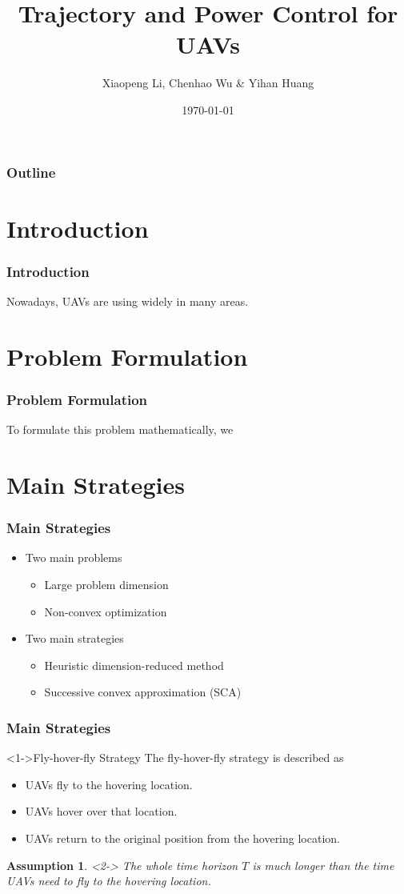 \documentclass[handout,11.5pt]{beamer}
\author[X. Li, C. Wu, \& Y. Huang]{Xiaopeng Li, Chenhao Wu \& Yihan Huang}
\title{Trajectory and Power Control for UAVs}
\institute[CUHK(SZ)]{The Chinese University of Hong Kong, Shenzhen}
\date{\today}
\newtheorem{assumption}{Assumption}
\begin{document}
\frame{\titlepage}

\begin{frame}
	\frametitle{Outline}
	\tableofcontents
\end{frame}

\section{Introduction}
\begin{frame}
	\frametitle{Introduction}
	Nowadays, UAVs are using widely in many areas.
\end{frame}

\section{Problem Formulation}
\begin{frame}
	\frametitle{Problem Formulation}
	To formulate this problem mathematically, we 
\end{frame}

\section{Main Strategies}
\begin{frame}
	\frametitle{Main Strategies}
	\begin{itemize}\itemsep4em
		\item<1-> Two main problems
		\begin{itemize}
			\item Large problem dimension
			\item Non-convex optimization
		\end{itemize}
		\item<2-> Two main strategies
		\begin{itemize}
			\item Heuristic dimension-reduced method
			\item Successive convex approximation (SCA)
		\end{itemize}
	\end{itemize}
\end{frame}


\begin{frame}
\frametitle{Main Strategies}
	\begin{block}<1->{Fly-hover-fly Strategy}
		The fly-hover-fly strategy is described as
		\begin{itemize}
			\item UAVs fly to the hovering location.
			\item UAVs hover over that location.
			\item UAVs return to the original position from the hovering location.
		\end{itemize}
	\end{block}
	\baselineskip
	\begin{assumption}<2->
		The whole time horizon $T$ is \alert{much longer} than the time UAVs need to fly to the hovering location.
	\end{assumption}
\end{frame}
\end{document}
